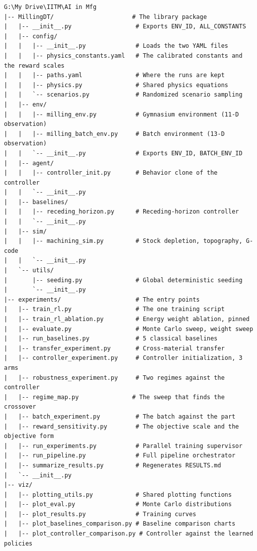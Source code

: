 \documentclass[11pt,a4paper]{article}
\begin{document}
\begin{lstlisting}[style=bash, caption=Project directory tree]
G:\My Drive\IITM\AI in Mfg
|-- MillingDT/                      # The library package
|   |-- __init__.py                  # Exports ENV_ID, ALL_CONSTANTS
|   |-- config/
|   |   |-- __init__.py              # Loads the two YAML files
|   |   |-- physics_constants.yaml   # The calibrated constants and the reward scales
|   |   |-- paths.yaml               # Where the runs are kept
|   |   |-- physics.py               # Shared physics equations
|   |   `-- scenarios.py             # Randomized scenario sampling
|   |-- env/
|   |   |-- milling_env.py           # Gymnasium environment (11-D observation)
|   |   |-- milling_batch_env.py     # Batch environment (13-D observation)
|   |   `-- __init__.py              # Exports ENV_ID, BATCH_ENV_ID
|   |-- agent/
|   |   |-- controller_init.py       # Behavior clone of the controller
|   |   `-- __init__.py
|   |-- baselines/
|   |   |-- receding_horizon.py      # Receding-horizon controller
|   |   `-- __init__.py
|   |-- sim/
|   |   |-- machining_sim.py         # Stock depletion, topography, G-code
|   |   `-- __init__.py
|   `-- utils/
|       |-- seeding.py               # Global deterministic seeding
|       `-- __init__.py
|-- experiments/                     # The entry points
|   |-- train_rl.py                  # The one training script
|   |-- train_rl_ablation.py         # Energy weight ablation, pinned
|   |-- evaluate.py                  # Monte Carlo sweep, weight sweep
|   |-- run_baselines.py             # 5 classical baselines
|   |-- transfer_experiment.py       # Cross-material transfer
|   |-- controller_experiment.py     # Controller initialization, 3 arms
|   |-- robustness_experiment.py     # Two regimes against the controller
|   |-- regime_map.py               # The sweep that finds the crossover
|   |-- batch_experiment.py          # The batch against the part
|   |-- reward_sensitivity.py        # The objective scale and the objective form
|   |-- run_experiments.py           # Parallel training supervisor
|   |-- run_pipeline.py              # Full pipeline orchestrator
|   |-- summarize_results.py         # Regenerates RESULTS.md
|   `-- __init__.py
|-- viz/
|   |-- plotting_utils.py            # Shared plotting functions
|   |-- plot_eval.py                 # Monte Carlo distributions
|   |-- plot_results.py              # Training curves
|   |-- plot_baselines_comparison.py # Baseline comparison charts
|   |-- plot_controller_comparison.py # Controller against the learned policies

\end{lstlisting}
\end{document}
